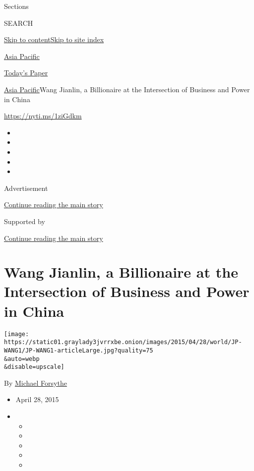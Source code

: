 Sections

SEARCH

\protect\hyperlink{site-content}{Skip to
content}\protect\hyperlink{site-index}{Skip to site index}

\href{https://www.nytimes3xbfgragh.onion/section/world/asia}{Asia
Pacific}

\href{https://myaccount.nytimes3xbfgragh.onion/auth/login?response_type=cookie\&client_id=vi}{}

\href{https://www.nytimes3xbfgragh.onion/section/todayspaper}{Today's
Paper}

\href{/section/world/asia}{Asia Pacific}\textbar{}Wang Jianlin, a
Billionaire at the Intersection of Business and Power in China

\url{https://nyti.ms/1ziGdkm}

\begin{itemize}
\item
\item
\item
\item
\item
\end{itemize}

Advertisement

\protect\hyperlink{after-top}{Continue reading the main story}

Supported by

\protect\hyperlink{after-sponsor}{Continue reading the main story}

\hypertarget{wang-jianlin-a-billionaire-at-the-intersection-of-business-and-power-in-china}{%
\section{Wang Jianlin, a Billionaire at the Intersection of Business and
Power in
China}\label{wang-jianlin-a-billionaire-at-the-intersection-of-business-and-power-in-china}}

\texttt{[image: https://static01.graylady3jvrrxbe.onion/images/2015/04/28/world/JP-WANG1/JP-WANG1-articleLarge.jpg?quality=75\\\&auto=webp\\\&disable=upscale]}

By \href{http://www.nytimes3xbfgragh.onion/by/michael-forsythe}{Michael
Forsythe}

\begin{itemize}
\item
  April 28, 2015
\item
  \begin{itemize}
  \item
  \item
  \item
  \item
  \item
  \end{itemize}
\end{itemize}

